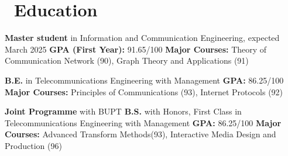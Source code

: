\documentclass{resume}
\begin{document}



\section{\faGraduationCap\ Education}
\textbf{Master student} in Information and Communication Engineering, expected March 2025 \newline
\textbf{GPA (First Year):} 91.65/100 \newline
\textbf{Major Courses:} Theory of Communication Network (90), Graph Theory and Applications (91)

\textbf{B.E.} in Telecommunications Engineering with Management \newline
\textbf{GPA:} 86.25/100 \newline
\textbf{Major Courses:} Principles of Communications (93), Internet Protocols (92)

\textbf{Joint Programme} with BUPT \newline
\textbf{B.S.} with Honors, First Class in Telecommunications Engineering with Management \newline
\textbf{GPA:} 86.25/100 \newline
\textbf{Major Courses:} Advanced Transform Methods(93), Interactive Media Design and Production (96)
\end{document}
